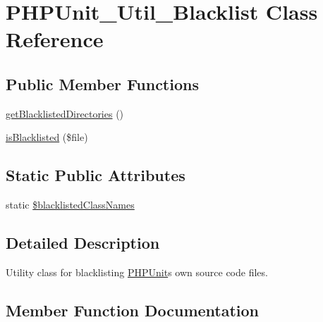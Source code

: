 \hypertarget{class_p_h_p_unit___util___blacklist}{}\section{P\+H\+P\+Unit\+\_\+\+Util\+\_\+\+Blacklist Class Reference}
\label{class_p_h_p_unit___util___blacklist}
\subsection*{Public Member Functions}
\begin{DoxyCompactItemize}
\item 
\mbox{\hyperlink{class_p_h_p_unit___util___blacklist_ac3e9adbe7b1c282f0eece963fa29034f}{get\+Blacklisted\+Directories}} ()
\item 
\mbox{\hyperlink{class_p_h_p_unit___util___blacklist_a98667dd09d1cb4c06b25725e521fd029}{is\+Blacklisted}} (\$file)
\end{DoxyCompactItemize}
\subsection*{Static Public Attributes}
\begin{DoxyCompactItemize}
\item 
static \mbox{\hyperlink{class_p_h_p_unit___util___blacklist_aaaff72b9bed45854bfed8c3c70b31916}{\$blacklisted\+Class\+Names}}
\end{DoxyCompactItemize}


\subsection{Detailed Description}
Utility class for blacklisting \mbox{\hyperlink{namespace_p_h_p_unit}{P\+H\+P\+Unit}}\textquotesingle{}s own source code files. 

\subsection{Member Function Documentation}
\mbox{\label{class_p_h_p_unit___util___blacklist_ac3e9adbe7b1c282f0eece963fa29034f}} 
